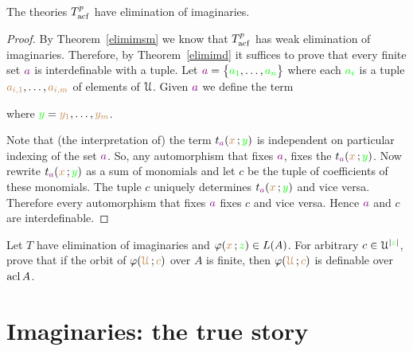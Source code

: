 \documentclass[creche.tex]{subfiles}
\begin{document}
\begin{theorem}\label{elimimacf} 
The theories $T^p_{\rm acf}$ have elimination of imaginaries.
\end{theorem}

\begin{proof}
By Theorem~\ref{elimimsm} we know that $T^p_{\rm acf}$ has weak elimination of imaginaries. Therefore, by Theorem~\ref{elimimd} it suffices to prove that every finite set ${\color{violet} a}$ is interdefinable with a tuple. Let ${\color{violet} a}=\big\{{\color{green} a_1},\dots,{\color{green} a_n}\big\}$ where each ${\color{green} a_i}$ is a tuple ${\color{brown} a_{i,1}},\dots,{\color{brown} a_{i,m}}$ of elements of $\EuScript U$. Given ${\color{violet} a}$ we define the term

\hfill where ${\color{green} y}={\color{brown} y_1},\dots,{\color{brown} y_m}$.


Note that (the interpretation of) the term $t_{\color{violet} a}({\color{brown} x}\,;{\color{green} y})$ is independent on particular indexing of the set ${\color{violet} a}$. So, any automorphism that fixes ${\color{violet} a}$, fixes the  $t_{\color{violet} a}({\color{brown} x}\,;{\color{green} y})$. Now rewrite $t_{\color{violet} a}({\color{brown} x}\,;{\color{green} y})$ as a sum of monomials and let $c$ be the tuple of coefficients of these monomials. The tuple $c$ uniquely determines $t_{\color{violet} a}({\color{brown} x}\,;{\color{green} y})$ and vice versa. Therefore every automorphism that fixes  ${\color{violet} a}$ fixes  $c$ and vice versa. Hence  ${\color{violet} a}$ and  $c$ are interdefinable.
\end{proof}

\begin{exercise}
Let $T$ have elimination of imaginaries and $\varphi({\color{brown} x}\,;{\color{green} z})\in L(A)$. For arbitrary $c\in\EuScript U^{|{\color{green} z}|}$, prove that if the orbit of $\varphi({\color{brown}\EuScript U}\,; {\color{brown} c})$ over $A$ is finite, then $\varphi({\color{brown}\EuScript U}\,; {\color{brown} c})$ is definable over $\mathop{\rm acl} A$.\QED
\end{exercise}


\section{Imaginaries: the true story}\label{imaginaries_long}
\end{document}

